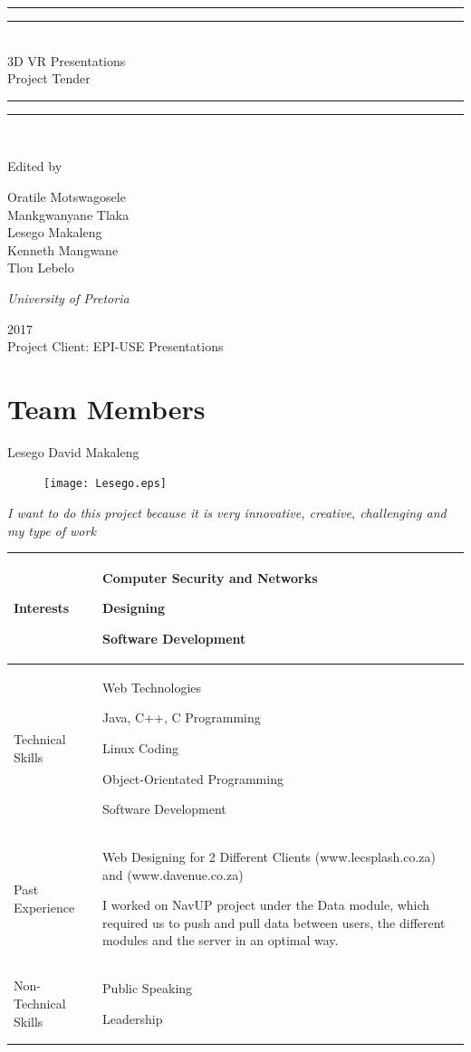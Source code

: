 \documentclass{article}
\newcommand*{\titleGP}{\begingroup %
\centering %
\vspace*{\baselineskip} %

\rule{\textwidth}{1.6pt}\vspace*{-\baselineskip}\vspace*{2pt} %
\rule{\textwidth}{0.4pt}\\[\baselineskip] %

{\LARGE 3D VR Presentations\\ Project  Tender}\\[0.2\baselineskip] %

\rule{\textwidth}{0.4pt}\vspace*{-\baselineskip}\vspace{3.2pt} %
\rule{\textwidth}{1.6pt}\\[\baselineskip] %

\scshape %
\vspace*{2\baselineskip} %

Edited by \\[\baselineskip]
{\Large Oratile Motswagosele \\ Mankgwanyane Tlaka \\ Lesego Makaleng \\ Kenneth Mangwane \\ Tlou Lebelo\par} %

{\itshape University of Pretoria\par} %

\vfill %

{\scshape 2017} \\[0.3\baselineskip] %
{ Project Client: EPI-USE Presentations}\par %

\endgroup}
\begin{document}
 

\titleGP %
\pagebreak
\section{Team Members}
\centering
{\huge Lesego David Makaleng}
\begin{figure}[h]
\centering
\texttt{[image: Lesego.eps]} 
\end{figure}

 	\textit{I want to do this project because it is very innovative, creative, challenging and my type of work}

\begin{center}
\begin{tabularx}{1.0\textwidth}{|p{3cm}|X|}
\hline
 {\LARGE Interests} & 
 \begin{compactitem}
     \item {\large Computer Security and Networks}
     \item {\large Designing}
     \item {\large Software Development}
 \end{compactitem} \\ 
 \hline
 {\LARGE Technical Skills} & 
 \begin{compactitem}
     \item {\large Web Technologies} 
     \item {\large Java, C++, C Programming}
     \item {\large Linux Coding}
     \item {\large Object-Orientated Programming}
     \item {\large Software Development}
 \end{compactitem} \\ 
 \hline
 {\LARGE Past Experience} & 
 \begin{compactitem}
     \item {\large Web Designing for 2 Different Clients (www.lecsplash.co.za) and (www.davenue.co.za)}
	 \item {\large I worked on NavUP project under the Data module, which required us to push and pull data between users, the different modules and the server in an optimal way.}
 \end{compactitem} \\ 
 \hline
 {\LARGE Non-Technical Skills} & 
 \begin{compactitem}
     \item {\large Public Speaking}
     \item {\large Leadership}
 \end{compactitem} \\
 \hline 
\end{tabularx}
\end{center}
\end{document}
